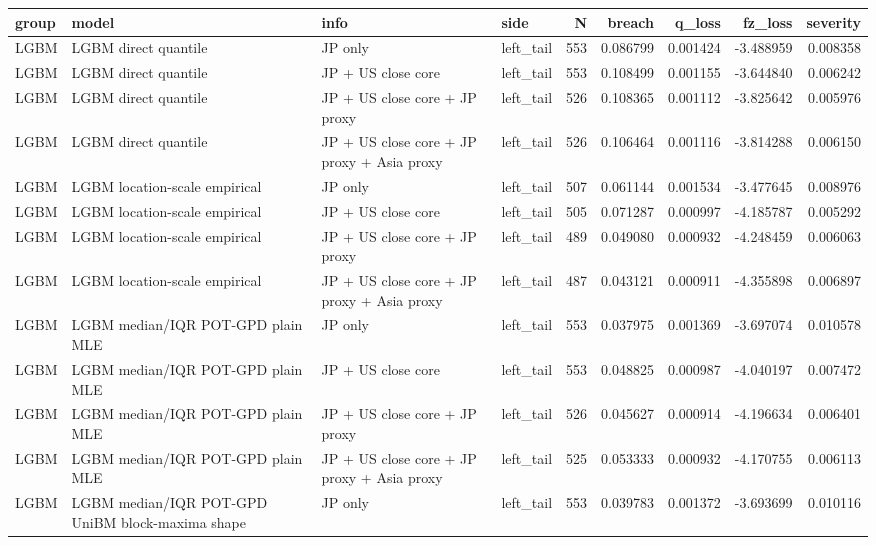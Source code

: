 \begin{tabular}{lll lrrrrr}
\toprule
group & model & info & side & N & breach & q_loss & fz_loss & severity \\
\midrule
LGBM & LGBM direct quantile & JP only & left\_tail & 553 & 0.086799 & 0.001424 & -3.488959 & 0.008358 \\
LGBM & LGBM direct quantile & JP + US close core & left\_tail & 553 & 0.108499 & 0.001155 & -3.644840 & 0.006242 \\
LGBM & LGBM direct quantile & JP + US close core + JP proxy & left\_tail & 526 & 0.108365 & 0.001112 & -3.825642 & 0.005976 \\
LGBM & LGBM direct quantile & JP + US close core + JP proxy + Asia proxy & left\_tail & 526 & 0.106464 & 0.001116 & -3.814288 & 0.006150 \\
LGBM & LGBM location-scale empirical & JP only & left\_tail & 507 & 0.061144 & 0.001534 & -3.477645 & 0.008976 \\
LGBM & LGBM location-scale empirical & JP + US close core & left\_tail & 505 & 0.071287 & 0.000997 & -4.185787 & 0.005292 \\
LGBM & LGBM location-scale empirical & JP + US close core + JP proxy & left\_tail & 489 & 0.049080 & 0.000932 & -4.248459 & 0.006063 \\
LGBM & LGBM location-scale empirical & JP + US close core + JP proxy + Asia proxy & left\_tail & 487 & 0.043121 & 0.000911 & -4.355898 & 0.006897 \\
LGBM & LGBM median/IQR POT-GPD plain MLE & JP only & left\_tail & 553 & 0.037975 & 0.001369 & -3.697074 & 0.010578 \\
LGBM & LGBM median/IQR POT-GPD plain MLE & JP + US close core & left\_tail & 553 & 0.048825 & 0.000987 & -4.040197 & 0.007472 \\
LGBM & LGBM median/IQR POT-GPD plain MLE & JP + US close core + JP proxy & left\_tail & 526 & 0.045627 & 0.000914 & -4.196634 & 0.006401 \\
LGBM & LGBM median/IQR POT-GPD plain MLE & JP + US close core + JP proxy + Asia proxy & left\_tail & 525 & 0.053333 & 0.000932 & -4.170755 & 0.006113 \\
LGBM & LGBM median/IQR POT-GPD UniBM block-maxima shape & JP only & left\_tail & 553 & 0.039783 & 0.001372 & -3.693699 & 0.010116 \\

\end{tabular}
